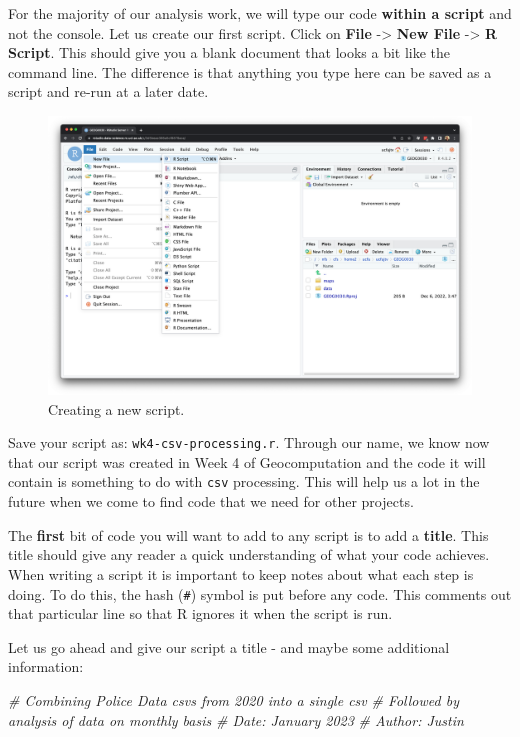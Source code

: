 \documentclass[
]{book}
\newenvironment{Shaded}{\begin{snugshade}}{\end{snugshade}}
\newcommand{\CommentTok}[1]{\textcolor[rgb]{0.56,0.35,0.01}{\textit{#1}}}
\begin{document}
For the majority of our analysis work, we will type our code \textbf{within a script} and not the console. Let us create our first script. Click on \textbf{File} -\textgreater{} \textbf{New File} -\textgreater{} \textbf{R Script}. This should give you a blank document that looks a bit like the command line. The difference is that anything you type here can be saved as a script and re-run at a later date.

\begin{figure}

{\centering \includegraphics[width=0.9\linewidth]{images/w04/new-script} 

}

\caption{Creating a new script.}\label{fig:04-rstudio-interface-script-open}
\end{figure}

Save your script as: \texttt{wk4-csv-processing.r}. Through our name, we know now that our script was created in Week 4 of Geocomputation and the code it will contain is something to do with \texttt{csv} processing. This will help us a lot in the future when we come to find code that we need for other projects.

The \textbf{first} bit of code you will want to add to any script is to add a \textbf{title}. This title should give any reader a quick understanding of what your code achieves. When writing a script it is important to keep notes about what each step is doing. To do this, the hash (\texttt{\#}) symbol is put before any code. This comments out that particular line so that R ignores it when the script is run.

Let us go ahead and give our script a title - and maybe some additional information:

\begin{Shaded}
\begin{Highlighting}[]
\CommentTok{\# Combining Police Data csv\textquotesingle{}s from 2020 into a single csv}
\CommentTok{\# Followed by analysis of data on monthly basis}
\CommentTok{\# Date: January 2023}
\CommentTok{\# Author: Justin }
\end{Highlighting}
\end{Shaded}
\end{document}
